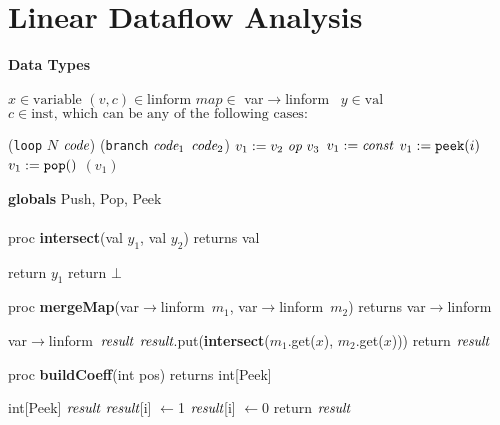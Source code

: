 \section{Linear Dataflow Analysis}

\newcommand{\maptype}{var$\rightarrow$linform~}
\newcommand{\la}{$\leftarrow$}
\newcommand{\IND}{\begin{ALC@g}}
\newcommand{\UND}{\end{ALC@g}}

\begin{algorithm}
{\bf Data Types}
\begin{algorithmic}
\STATE $x \in \mbox{variable}$
\STATE $(v, c) \in \mbox{linform}$
\STATE $map \in $ \maptype
\STATE $y \in \mbox{val}$
\STATE $c \in \mbox{inst, which can be any of the following cases:}$
\IND
\STATE ({\tt loop} $N$ $\mbox{\it code}$)
\STATE ({\tt branch} $\mbox{\it code}_1$ $\mbox{\it code}_2$)
\STATE $v_1 := v_2~\mbox{\it op}~v_3$
\STATE $v_1 := \mbox{\it const}$
\STATE $v_1 := \mbox{\tt peek}(i)$
\STATE $v_1 := \mbox{\tt pop}()$
$(v_1)$
\UND
\end{algorithmic}
\end{algorithm}

\begin{algorithm}
{\bf globals} Push, Pop, Peek \\ ~ \\
%
proc {\bf intersect}(val $y_1$, val $y_2$) returns val
\begin{algorithmic}
\STATE return $y_1$
\ELSE
\STATE return $\bot$
\ENDIF
\end{algorithmic}
\end{algorithm}

\begin{algorithm}
proc {\bf mergeMap}(\maptype $m_1$, \maptype $m_2$) returns \maptype
\begin{algorithmic}
\STATE \maptype $\mbox{\it result}$
\STATE $\mbox{\it result}$.put({\bf intersect}($m_1$.get($x$), $m_2$.get($x$)))
\ENDFOR
\STATE return $\mbox{\it result}$
\end{algorithmic}
\end{algorithm}

\begin{algorithm}
proc {\bf buildCoeff}(int pos) returns int[Peek]
\begin{algorithmic}
\STATE int[Peek] $\mbox{\it result}$
\STATE $\mbox{\it result}$[i] \la 1
\ELSE
\STATE $\mbox{\it result}$[i] \la 0
\ENDIF
\ENDFOR
\STATE return $\mbox{\it result}$
\end{algorithmic}
\end{algorithm}


